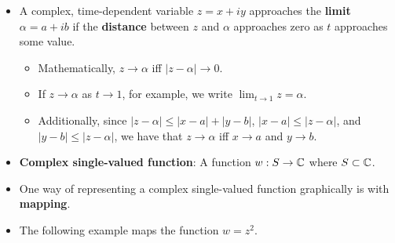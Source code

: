 \documentclass[../main.tex]{subfiles}
\begin{document}
\begin{itemize}
    \item A complex, time-dependent variable $z=x+iy$ approaches the \textbf{limit} $\alpha=a+ib$ if the \textbf{distance} between $z$ and $\alpha$ approaches zero as $t$ approaches some value.
    \begin{itemize}
        \item Mathematically, $z\to\alpha$ iff $|z-\alpha|\to 0$.
        \item If $z\to\alpha$ as $t\to 1$, for example, we write $\lim_{t\to 1}z=\alpha$.
        \item Additionally, since $|z-\alpha|\leq|x-a|+|y-b|$, $|x-a|\leq|z-\alpha|$, and $|y-b|\leq|z-\alpha|$, we have that $z\to\alpha$ iff $x\to a$ and $y\to b$.
    \end{itemize}
    \item \textbf{Complex single-valued function}: A function $w:S\to\mathbb{C}$ where $S\subset\mathbb{C}$.
    \item One way of representing a complex single-valued function graphically is with \textbf{mapping}.
    \item The following example maps the function $w=z^2$.
    \begin{figure}[h!]
        \centering
        \begin{subfigure}[b]{0.49\linewidth}
            \centering
\end{subfigure}
\end{figure}
\end{itemize}
\end{document}
